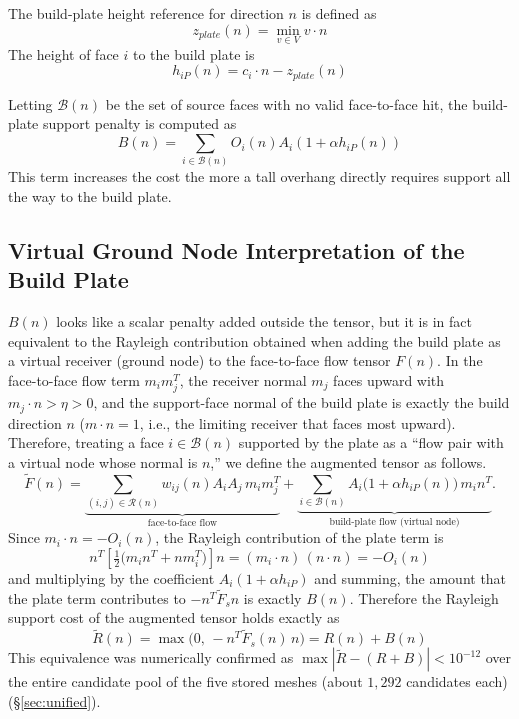 \documentclass[11pt,a4paper]{article}
\begin{document}
The build-plate height reference for direction $n$ is defined as
\begin{equation}
z_{plate}(n)=\min_{v\in V} v\cdot n
\end{equation}
The height of face $i$ to the build plate is
\begin{equation}
h_{iP}(n)=c_i\cdot n-z_{plate}(n)
\end{equation}

Letting $\mathcal{B}(n)$ be the set of source faces with no valid face-to-face hit,
the build-plate support penalty is computed as
\begin{equation}
B(n)
=
\sum_{i\in\mathcal{B}(n)}
O_i(n)A_i\left(1+\alpha h_{iP}(n)\right)
\end{equation}
This term increases the cost the more a tall overhang directly requires support all the way to the build plate.

\subsection{Virtual Ground Node Interpretation of the Build Plate}
\label{sec:groundnode}

$B(n)$ looks like a scalar penalty added outside the tensor,
but it is in fact equivalent to the Rayleigh contribution obtained when adding the build plate as a virtual receiver (ground node)
to the face-to-face flow tensor $F(n)$.
In the face-to-face flow term $m_im_j^T$, the receiver normal $m_j$ faces upward with $m_j\cdot n>\eta>0$,
and the support-face normal of the build plate is exactly the build direction $n$
($m\cdot n=1$, i.e., the limiting receiver that faces most upward).
Therefore, treating a face $i\in\mathcal{B}(n)$ supported by the plate as a ``flow pair with a virtual node whose normal is $n$,''
we define the augmented tensor as follows.
\begin{equation}
\tilde F(n)
=
\underbrace{\sum_{(i,j)\in\mathcal{R}(n)} w_{ij}(n)A_iA_j\,m_im_j^T}_{\text{face-to-face flow}}
+
\underbrace{\sum_{i\in\mathcal{B}(n)} A_i\big(1+\alpha h_{iP}(n)\big)\,m_in^T}_{\text{build-plate flow (virtual node)}}.
\end{equation}
Since $m_i\cdot n=-O_i(n)$, the Rayleigh contribution of the plate term is
\begin{equation}
n^T\!\left[\tfrac{1}{2}\big(m_in^T+nm_i^T\big)\right]\!n
= (m_i\cdot n)\,(n\cdot n) = -O_i(n)
\end{equation}
and multiplying by the coefficient $A_i(1+\alpha h_{iP})$ and summing,
the amount that the plate term contributes to $-n^T\tilde F_s n$ is exactly $B(n)$.
Therefore the Rayleigh support cost of the augmented tensor holds exactly as
\begin{equation}
\tilde R(n)
=
\max\!\big(0,\,-n^T\tilde F_s(n)\,n\big)
=
R(n)+B(n)
\label{eq:Rtilde}
\end{equation}
This equivalence was numerically confirmed as $\max|\tilde R-(R+B)|<10^{-12}$ over the entire candidate pool of the five stored meshes
(about $1{,}292$ candidates each) (\S\ref{sec:unified}).
\end{document}
